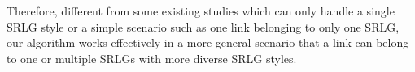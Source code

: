 Therefore, different from some existing studies \cite{datta2008graph} which can only handle a single SRLG style or a simple scenario such as  one link belonging to only one SRLG, our algorithm works effectively in a more  general scenario that a link can belong to one or multiple SRLGs with more diverse SRLG styles.







